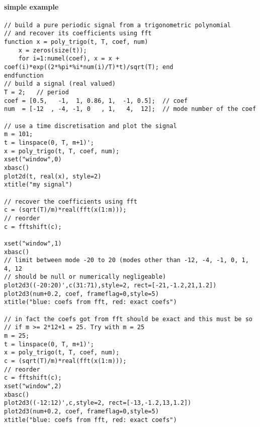\begin{examples}
 \paragraph{simple example}
  \begin{Verbatim}
// build a pure periodic signal from a trigonometric polynomial
// and recover its coefficients using fft
function x = poly_trigo(t, T, coef, num)
    x = zeros(size(t));
    for i=1:numel(coef), x = x + coef(i)*exp((2*%pi*%i*num(i)/T)*t)/sqrt(T); end
endfunction
// build a signal (real valued)
T = 2;   // period
coef = [0.5,   -1,  1, 0.86, 1,  -1, 0.5];  // coef
num  = [-12  , -4, -1, 0   , 1,   4,  12];  // mode number of the coef

// use a time discretisation and plot the signal
m = 101;
t = linspace(0, T, m+1)';
x = poly_trigo(t, T, coef, num);
xset("window",0)
xbasc()
plot2d(t, real(x), style=2)
xtitle("my signal")

// recover the coefficients using fft
c = (sqrt(T)/m)*real(fft(x(1:m)));
// reorder
c = fftshift(c);

xset("window",1)
xbasc()
// limit between mode -20 to 20 (modes other than -12, -4, -1, 0, 1, 4, 12
// should be null or numerically negligeable)
plot2d3((-20:20)',c(31:71),style=2, rect=[-21,-1.2,21,1.2])
plot2d3(num+0.2, coef, frameflag=0,style=5)
xtitle("blue: coefs from fft, red: exact coefs")

// in fact the coefs got from fft should be exact and this must be so
// if m >= 2*12+1 = 25. Try with m = 25
m = 25;
t = linspace(0, T, m+1)';
x = poly_trigo(t, T, coef, num);
c = (sqrt(T)/m)*real(fft(x(1:m)));
// reorder
c = fftshift(c);
xset("window",2)
xbasc()
plot2d3((-12:12)',c,style=2, rect=[-13,-1.2,13,1.2])
plot2d3(num+0.2, coef, frameflag=0,style=5)
xtitle("blue: coefs from fft, red: exact coefs")
  \end{Verbatim}
 \end{examples}




